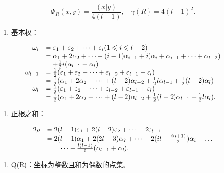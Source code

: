 \[
\Phi_ {R} (x, y) = \frac {(x | y)}{4 (l - 1)}, \quad \gamma (R) = 4 (l - 1) ^ {2}.
\]

\begin{enumerate}
\def\labelenumi{(\Roman{enumi})}
\setcounter{enumi}{5}
\tightlist
\item
  基本权：
\end{enumerate}

\[
\begin{array}{r l} \omega_ {i} & = \varepsilon_ {1} + \varepsilon_ {2} + \dots + \varepsilon_ {i} (1 \leqslant i \leqslant l - 2) \\ & = \alpha_ {1} + 2 \alpha_ {2} + \dots + (i - 1) \alpha_ {i - 1} + i (\alpha_ {i} + \alpha_ {i + 1} + \dots + \alpha_ {l - 2}) \\ & \quad + \frac {1}{2} i (\alpha_ {l - 1} + \alpha_ {l}) \\ \omega_ {l - 1} & = \frac {1}{2} (\varepsilon_ {1} + \varepsilon_ {2} + \dots + \varepsilon_ {l - 2} + \varepsilon_ {l - 1} - \varepsilon_ {l}) \\ & = \frac {1}{2} (\alpha_ {1} + 2 \alpha_ {2} + \dots + (l - 2) \alpha_ {l - 2} + \frac {1}{2} l \alpha_ {l - 1} + \frac {1}{2} (l - 2) \alpha_ {l}) \\ \omega_ {l} & = \frac {1}{2} (\varepsilon_ {1} + \varepsilon_ {2} + \dots + \varepsilon_ {l - 2} + \varepsilon_ {l - 1} + \varepsilon_ {l}) \\ & = \frac {1}{2} (\alpha_ {1} + 2 \alpha_ {2} + \dots + (l - 2) \alpha_ {l - 2} + \frac {1}{2} (l - 2) \alpha_ {l - 1} + \frac {1}{2} l \alpha_ {l}). \end{array}
\]

\begin{enumerate}
\def\labelenumi{(\Roman{enumi})}
\setcounter{enumi}{6}
\tightlist
\item
  正根之和：
\end{enumerate}

\[
\begin{array}{r l} 2 \rho & = 2 (l - 1) \varepsilon_ {1} + 2 (l - 2) \varepsilon_ {2} + \dots + 2 \varepsilon_ {l - 1} \\ & = 2 (l - 1) \alpha_ {1} + 2 (2 l - 3) \alpha_ {2} + \dots + 2 (i l - \frac {i (i + 1)}{2}) \alpha_ {i} + \dots \\ & \qquad \dots + \frac {l (l - 1)}{2} (\alpha_ {l - 1} + \alpha_ {l}). \end{array}
\]

\begin{enumerate}
\def\labelenumi{(\Roman{enumi})}
\setcounter{enumi}{7}
\tightlist
\item
  Q(R)：坐标为整数且和为偶数的点集。
\end{enumerate}

